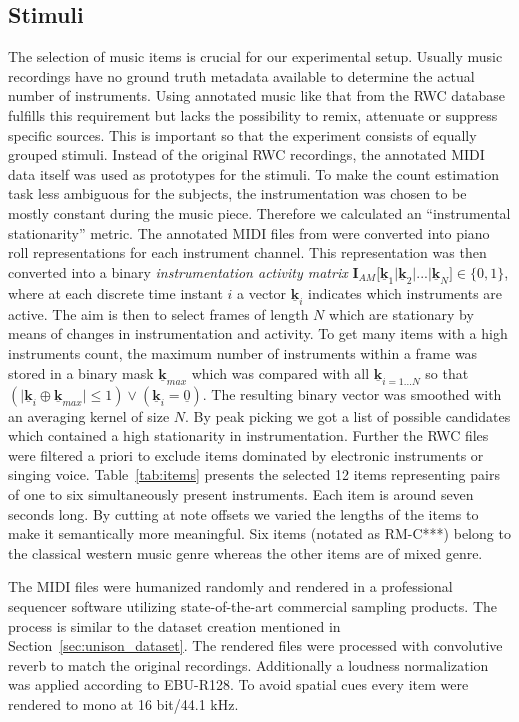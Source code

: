 \subsection{Stimuli}
The selection of music items is crucial for our experimental setup. Usually music recordings have no ground truth metadata available to determine the actual number of instruments. Using annotated music like that from the RWC database~\cite{rwc} fulfills this requirement but lacks the possibility to remix, attenuate or suppress specific sources. This is important so that the experiment consists of equally grouped stimuli. Instead of the original RWC recordings, the annotated MIDI data itself was used as prototypes for the stimuli.
To make the count estimation task less ambiguous for the subjects, the instrumentation was chosen to be mostly constant during the music piece.
Therefore we calculated an ``instrumental stationarity'' metric.
The annotated MIDI files from \cite{rwc} were converted into piano roll representations for each instrument channel. This representation was then converted into a binary \emph{instrumentation activity matrix} $\mathbf{I}_{AM}\lbrack \mathbf{\underline{k}}_1 \vert \mathbf{\underline{k}}_2 \vert  ... \vert \mathbf{\underline{k}}_N \rbrack \in \{0,1\}$, where at each discrete time instant $i$ a vector $\mathbf{\underline{k}}_i$ indicates which instruments are active. The aim is then to select frames of length $N$ which are stationary by means of changes in instrumentation and activity. To get many items with a high instruments count, the maximum number of instruments within a frame was stored in a binary mask $\mathbf{\underline{k}}_{max}$ which was compared with all $\mathbf{\underline{k}}_{i=1...N}$ so that $(\vert\mathbf{\underline{k}}_{i} \oplus \mathbf{\underline{k}}_{max}\vert \leq 1) \lor (\mathbf{\underline{k}}_{i} = \underline{0})$. The resulting binary vector was smoothed with an averaging kernel of size $N$. By peak picking we got a list of possible candidates which contained a high stationarity in instrumentation.
Further the RWC files were filtered a priori to exclude items dominated by electronic instruments or singing voice. Table~\ref{tab:items} presents the selected 12 items representing pairs of one to six simultaneously present instruments. Each item is around seven seconds long. By cutting at note offsets we varied the lengths of the items to make it semantically more meaningful. Six items (notated as RM-C***) belong to the classical western music genre whereas the other items are of mixed genre.
\par
The MIDI files were humanized randomly and rendered in a professional sequencer software utilizing state-of-the-art commercial sampling products.
The process is similar to the dataset creation mentioned in Section~\ref{sec:unison_dataset}.
The rendered files were processed with convolutive reverb to match the original recordings. 
Additionally a loudness normalization was applied according to EBU-R128\cite{EBU2011}. To avoid spatial cues every item were rendered to mono at 16 bit/44.1 kHz.

